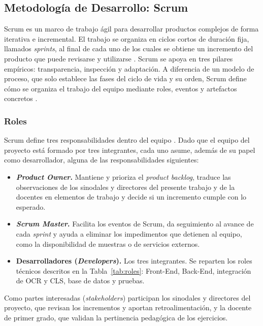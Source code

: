 \subsection{Metodología de Desarrollo: Scrum}

Scrum es un marco de trabajo ágil para desarrollar productos complejos de forma
iterativa e incremental. El trabajo se organiza en ciclos cortos de duración fija,
llamados \textit{sprints}, al final de cada uno de los cuales se obtiene un incremento
del producto que puede revisarse y utilizarse \cite{schwaber2020scrum}. Scrum se apoya
en tres pilares empíricos: transparencia, inspección y adaptación. A diferencia de un
modelo de proceso, que solo establece las fases del ciclo de vida y su orden, Scrum
define cómo se organiza el trabajo del equipo mediante roles, eventos y artefactos
concretos \cite{schwaber2020scrum, rubin2012essential}.

\subsubsection{Roles}

Scrum define tres responsabilidades dentro del equipo \cite{schwaber2020scrum}. Dado que
el equipo del proyecto está formado por tres integrantes, cada uno asume, además de su
papel como desarrollador, alguna de las responsabilidades siguientes:

\begin{itemize}
    \item \textbf{\textit{Product Owner}.} Mantiene y prioriza el \textit{product
    backlog}, traduce las observaciones de los sinodales y directores del presente trabajo y de la docentes en
    elementos de trabajo y decide si un incremento cumple con lo esperado.

    \item \textbf{\textit{Scrum Master}.} Facilita los eventos de Scrum, da seguimiento al
    avance de cada \textit{sprint} y ayuda a eliminar los impedimentos que detienen al
    equipo, como la disponibilidad de muestras o de servicios externos.

    \item \textbf{Desarrolladores (\textit{Developers}).} Los tres integrantes. Se reparten
    los roles técnicos descritos en la Tabla~\ref{tab:roles}: Front-End, Back-End,
    integración de OCR y CLS, base de datos y pruebas.
\end{itemize}

Como partes interesadas (\textit{stakeholders}) participan los sinodales y directores del proyecto, que
revisan los incrementos y aportan retroalimentación, y la docente de primer grado, que
validan la pertinencia pedagógica de los ejercicios.


